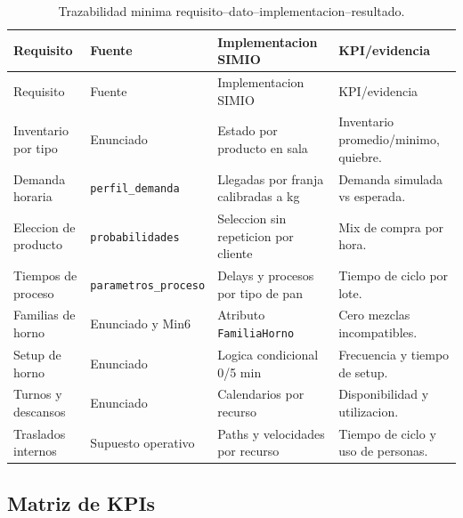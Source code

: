 \documentclass[12pt]{article}
\newcommand{\archivo}[1]{\texttt{#1}}
\begin{document}
\scriptsize
\begin{longtable}{L{3.0cm}L{3.3cm}L{4.1cm}L{4.1cm}}
\caption{Trazabilidad minima requisito--dato--implementacion--resultado.}\\
\toprule
{}
\color{white}Requisito & \color{white}Fuente & \color{white}Implementacion SIMIO & \color{white}KPI/evidencia \\
\midrule
\endfirsthead
\toprule
{}
\color{white}Requisito & \color{white}Fuente & \color{white}Implementacion SIMIO & \color{white}KPI/evidencia \\
\midrule
\endhead
Inventario por tipo & Enunciado & Estado por producto en sala & Inventario promedio/minimo, quiebre. \\
Demanda horaria & \archivo{perfil\_demanda} & Llegadas por franja calibradas a kg & Demanda simulada vs esperada. \\
Eleccion de producto & \archivo{probabilidades} & Seleccion sin repeticion por cliente & Mix de compra por hora. \\
Tiempos de proceso & \archivo{parametros\_proceso} & Delays y procesos por tipo de pan & Tiempo de ciclo por lote. \\
Familias de horno & Enunciado y Min6 & Atributo \archivo{FamiliaHorno} & Cero mezclas incompatibles. \\
Setup de horno & Enunciado & Logica condicional 0/5 min & Frecuencia y tiempo de setup. \\
Turnos y descansos & Enunciado & Calendarios por recurso & Disponibilidad y utilizacion. \\
Traslados internos & Supuesto operativo & Paths y velocidades por recurso & Tiempo de ciclo y uso de personas. \\
\bottomrule
\end{longtable}
\normalsize

\subsection{Matriz de KPIs}
\end{document}
